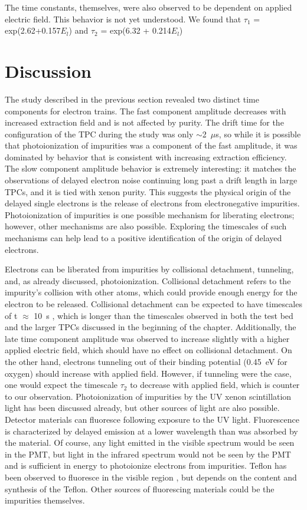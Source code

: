 The time constants, themselves, were also observed to be dependent on applied electric field. This behavior is not yet understood. We found that $\tau_{1}$ = exp(2.62+0.157$E_{l}$) and $\tau_{2}$ = exp(6.32 + 0.214$E_{l}$)

\section{Discussion}
The study described in the previous section revealed two distinct time components for electron trains. The fast component amplitude decreases with increased extraction field and is not affected by purity. The drift time for the configuration of the \ac{TPC} during the study was only $\sim$2~$\mu$s, so while it is possible that photoionization of impurities was a component of the fast amplitude, it was dominated by behavior that is consistent with increasing extraction efficiency. The slow component amplitude behavior is extremely interesting: it matches the observations of delayed electron noise continuing long past a drift length in large \ac{TPC}s, and it is tied with xenon purity. This suggests the physical origin of the delayed single electrons is the release of electrons from electronegative impurities. Photoionization of impurities is one possible mechanism for liberating electrons; however, other mechanisms are also possible. Exploring the timescales of such mechanisms can help lead to a positive identification of the origin of delayed electrons. 

Electrons can be liberated from impurities by collisional detachment, tunneling, and, as already discussed, photoionization. Collisional detachment refers to the impurity's collision with other atoms, which could provide enough energy for the electron to be released. Collisional detachment can be expected to have timescales of t $\approx$ 10~s \cite{SorensenKamdin2018}, which is longer than the timescales observed in both the test bed and the larger \ac{TPC}s discussed in the beginning of the chapter. Additionally, the late time component amplitude was observed to increase slightly with a higher applied electric field, which should have no effect on collisional detachment. On the other hand, electrons tunneling out of their binding potential (0.45~eV for oxygen) should increase with applied field. However, if tunneling were the case, one would expect the timescale $\tau_{2}$ to decrease with applied field, which is counter to our observation. Photoionization of impurities by the UV xenon scintillation light has been discussed already, but other sources of light are also possible. Detector materials can fluoresce following exposure to the UV light. Fluorescence is characterized by delayed emission at a lower wavelength than was absorbed by the material. Of course, any light emitted in the visible spectrum would be seen in the \ac{PMT}, but light in the infrared spectrum would not be seen by the \ac{PMT} and is sufficient in energy to photoionize electrons from impurities. Teflon has been observed to fluoresce in the visible region \cite{Gachkovskii1969} \cite{Khatipov2011}, but depends on the content and synthesis of the Teflon. Other sources of fluorescing materials could be the impurities themselves. 

